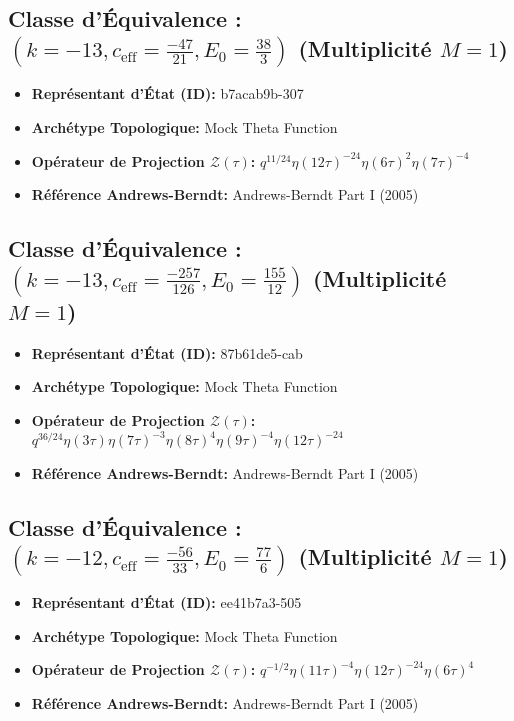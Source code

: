 \documentclass[11pt,twoside,openright]{book}
\begin{document}
\subsection*{Classe d'Équivalence : $(k=-13, c_{\text{eff}}=\frac{-47}{21}, E_0=\frac{38}{3})$ (Multiplicité $M=1$)}
\begin{itemize}
  \item \textbf{Représentant d'État (ID):} b7acab9b-307
  \item \textbf{Archétype Topologique:} Mock Theta Function
  \item \textbf{Opérateur de Projection $\mathcal{Z}(\tau)$:} $q^{11/24} \eta(12\tau)^{-24} \eta(6\tau)^{2} \eta(7\tau)^{-4}$
  \item \textbf{Référence Andrews-Berndt:} Andrews-Berndt Part I (2005)
\end{itemize}

\subsection*{Classe d'Équivalence : $(k=-13, c_{\text{eff}}=\frac{-257}{126}, E_0=\frac{155}{12})$ (Multiplicité $M=1$)}
\begin{itemize}
  \item \textbf{Représentant d'État (ID):} 87b61de5-cab
  \item \textbf{Archétype Topologique:} Mock Theta Function
  \item \textbf{Opérateur de Projection $\mathcal{Z}(\tau)$:} $q^{36/24} \eta(3\tau) \eta(7\tau)^{-3} \eta(8\tau)^{4} \eta(9\tau)^{-4} \eta(12\tau)^{-24}$
  \item \textbf{Référence Andrews-Berndt:} Andrews-Berndt Part I (2005)
\end{itemize}

\subsection*{Classe d'Équivalence : $(k=-12, c_{\text{eff}}=\frac{-56}{33}, E_0=\frac{77}{6})$ (Multiplicité $M=1$)}
\begin{itemize}
  \item \textbf{Représentant d'État (ID):} ee41b7a3-505
  \item \textbf{Archétype Topologique:} Mock Theta Function
  \item \textbf{Opérateur de Projection $\mathcal{Z}(\tau)$:} $q^{-1/2} \eta(11\tau)^{-4} \eta(12\tau)^{-24} \eta(6\tau)^{4}$
  \item \textbf{Référence Andrews-Berndt:} Andrews-Berndt Part I (2005)
\end{itemize}
\end{document}
